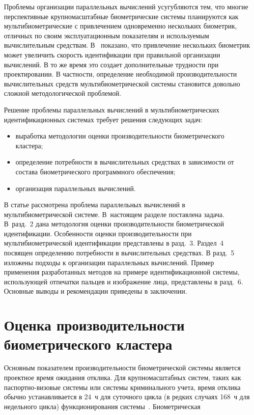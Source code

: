 \begin{multicols}{2}
     Проблемы организации параллельных вычислений усугубляются тем, что многие 
перспективные крупномасштабные биометрические системы планируются как 
мультибиометрические с привлечением одновременно нескольких биометрик, 
отличных по своим эксплуатационным показателям и используемым вычислительным 
средствам. В~\cite{2ush} показано, что привлечение нескольких биометрик может 
увеличить скорость идентификации при правильной организации вычислений. В то же 
время это создает дополнительные трудности при проектировании. В частности, 
определение необходимой производительности вычислительных средств 
мультибиометрической системы становится довольно сложной методологической 
проблемой.
    
     


     Решение проблемы параллельных вычислений в мультибиометрических 
идентификационных сис\-те\-мах требует решения следующих задач:
     \begin{itemize}
\item выработка методологии оценки производительности биометрического 
кластера;
\item определение потребности в вычислительных средствах в зависимости от 
состава биометрического программного обеспечения;
\item организация параллельных вычислений.
\end{itemize}


     В статье рассмотрена проблема параллельных вычислений в 
мультибиометрической системе. В~настоящем разделе поставлена задача. В~разд.~2 
дана методология оценки производительности биомет\-ри\-че\-ской идентификации. 
Особенности оценки производительности при муль\-ти\-био\-мет\-ри\-че\-ской идентификации 
представлены в разд.~3. %
 Раздел~4 посвящен определению потребности в 
вы\-чис\-ли\-тель\-ных средствах. В разд.~5 изложены подходы к организации параллельных 
вы\-чис\-ле\-ний. Пример применения разработанных методов на %
 примере 
идентификационной системы, использующей отпечатки пальцев и изображение лица, 
представлены в разд.~6. Основные выводы и рекомендации приведены в заключении.
     
     
     \section{Оценка производительности биометрического кластера}
     
     Основным показателем производительности биометрической системы является 
проектное время ожидания отклика. Для крупномасштабных систем, таких как 
паспортно-визовые системы или системы криминального учета, время отклика
обычно 
устанавливается в 24~ч для суточного цик\-ла 
(в редких случаях 168~ч для недельного цикла)
функционирования системы~\cite{10ush}. Био\-мет\-ри\-че\-ская\linebreak\vspace*{-12pt}


\end{multicols}
